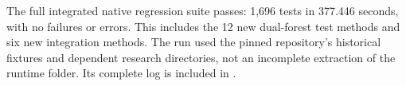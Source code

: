 The full integrated native regression suite passes: 1,696 tests in
377.446 seconds, with no failures or errors. This includes the 12 new
dual-forest test methods and six new integration methods. The run used
the pinned repository's historical fixtures and dependent research
directories, not an incomplete extraction of the runtime folder. Its
complete log is included in .

